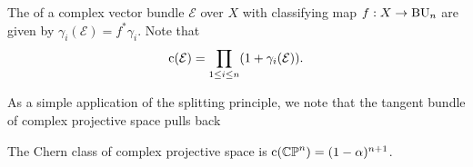 \begin{definition}\label{def:chern-roots}
	The  of a complex vector bundle $\mathcal{E}$ over $X$ with classifying map $f : X \to \mathrm{BU}_n$ are given by $\gamma_i(\mathcal{E}) = f^*\gamma_i$. Note that
	\[ \mathrm{c}(\mathcal{E}) = \prod_{1\leq i \leq n} (1+\gamma_i(\mathcal{E})). \]
\end{definition}

As a simple application of the splitting principle, we note that the tangent bundle of complex projective space pulls back
\begin{corollary}
	The Chern class of complex projective space is $\mathrm{c}(\mathbb{CP}^n)=(1-\alpha)^{n+1}$.
\end{corollary}

